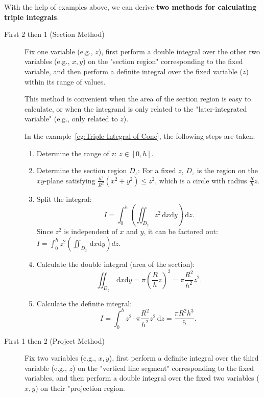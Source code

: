 \documentclass[11pt]{../../TexTemplate/elegantbook}
\begin{document}
\vspace{1cm}
With the help of examples above, we can derive \textbf{two methods for calculating triple integrals}.

\begin{description}
\item[First 2 then 1 (Section Method)] 
Fix one variable (e.g., \(z\)), first perform a double integral over the other two variables (e.g., \(x,y\)) 
on the "section region" corresponding to the fixed variable, 
and then perform a definite integral over the fixed variable (\(z\)) within its range of values.

This method is convenient when the area of the section region is easy to calculate, 
or when the integrand is only related to the "later-integrated variable" (e.g., only related to \(z\)).

In the example~\ref{eg:Triple Integral of Cone}, the following steps are taken:
\begin{enumerate}
    \item Determine the range of z: \(z \in [0, h]\). 
    \item Determine the section region \(D_z\): 
        For a fixed \(z\), \(D_z\) is the region on the \(xy\)-plane satisfying \(\frac{h^2}{R^2}(x^2 + y^2) \leqslant z^2\), 
        which is a circle with radius \(\frac{R}{h}z\).
    \item Split the integral: 
        \[
        I = \int_{0}^{h} \left( \iint_{D_z} z^2 \,\mathrm{d}x\mathrm{d}y \right) \,\mathrm{d}z.
        \] 
        Since \(z^2\) is independent of \(x\) and \(y\), it can be factored out:
        \(I = \int_{0}^{h} z^2 \left( \iint_{D_z} \,\mathrm{d}x\mathrm{d}y \right) dz\).
    \item Calculate the double integral (area of the section): 
        \[
        \iint_{D_z} \,\mathrm{d}x\mathrm{d}y = \pi \left( \frac{R}{h}z \right)^2 = \pi \frac{R^2}{h^2} z^{2}.
        \]
    \item Calculate the definite integral: 
        \[
        I = \int_{0}^{h} z^2 \cdot \pi \frac{R^2}{h^2} z^2 \,\mathrm{d}z = \frac{\pi R^2 h^3}{5}.\
        \]
\end{enumerate}

\item[First 1 then 2 (Project Method)]
Fix two variables (e.g., \(x,y\)), first perform a definite integral over the third variable (e.g., \(z\)) 
on the "vertical line segment" corresponding to the fixed variables, 
and then perform a double integral over the fixed two variables ( \(x,y\)) on their "projection region. 


\end{description}
\end{document}
